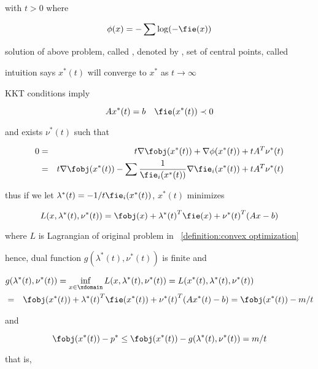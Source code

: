 \documentclass[17pt,landscape]{foils}
\begin{document}
{	with $t>0$
	where

	$$
		\phi(x) = - \sum \log(-\fie(x))
	$$

\vitem
	solution of above problem, called , denoted by ,
	set of central points, called 

\vitem
	intuition says $x^\ast(t)$ will converge to $x^\ast$
	as $t\to\infty$

\vvitem KKT conditions imply

	$$
		Ax^\ast(t) = b \quad \fie(x^\ast(t)) \prec 0
	$$

	and exists $\nu^\ast(t)$ such that

	\begin{eqnarray*}
		0
		&=&
		t \nabla \fobj(x^\ast(t)) + \nabla \phi(x^\ast(t)) + t A^T \nu^\ast(t)
		\\
		 &=&
		 t\nabla \fobj(x^\ast(t))
		 - \sum \frac{1}{\fie_i(x^\ast(t))} \nabla\fie_i(x^\ast(t))
		 + t A^T \nu^\ast(t)
	\end{eqnarray*}

\vitem
	thus if we let $\lambda^\ast(t) = -1/t\fie_i(x^\ast(t))$,
	$x^\ast(t)$ minimizes

	$$
		L(x,\lambda^\ast(t),\nu^\ast(t))
		= \fobj(x) + {\lambda^\ast(t)}^T \fie(x) + {\nu^\ast(t)}^T (Ax-b)
	$$

	where $L$ is Lagrangian of original problem in ~\ref{definition:convex optimization}

\vitem
	hence, dual function $g(\lambda^\ast(t),\nu^\ast(t))$ is finite
	and

	\begin{eqnarray*}
	\lefteqn{
		g(\lambda^\ast(t), \nu^\ast(t))
		=
		\inf_{x\in\xdomain} L(x,\lambda^\ast(t),\nu^\ast(t))
		=
		L(x^\ast(t),\lambda^\ast(t),\nu^\ast(t))
	}
	\\
	&
	=
	&
		\fobj(x^\ast(t)) + {\lambda^\ast(t)}^T \fie(x^\ast(t)) + {\nu^\ast(t)}^T (Ax^\ast(t)-b)
		= \fobj(x^\ast(t)) - m/t
	\end{eqnarray*}

	and

	$$
		\fobj(x^\ast(t)) - p^\ast \leq \fobj(x^\ast(t)) - g(\lambda^\ast(t), \nu^\ast(t))
		= m/t
	$$

\vitem []
	that is,

	\begin{quote}
	\begin{center}
	\end{center}
	\end{quote}

}
\end{document}
